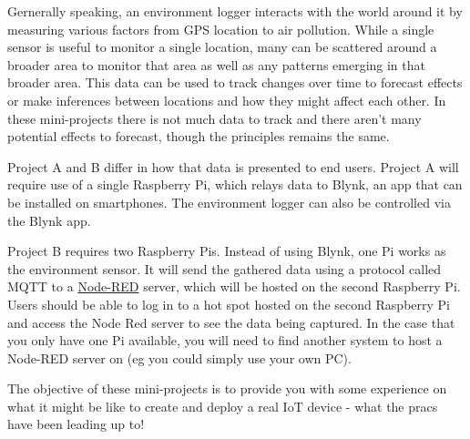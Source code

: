 Gernerally speaking, an environment logger interacts with the world around it by measuring various factors from GPS location to air pollution. While a single sensor is useful to monitor a single location, many can be scattered around a broader area to monitor that area as well as any patterns emerging in that broader area. This data can be used to track changes over time to forecast effects or make inferences between locations and how they might affect each other. In these mini-projects there is not much data to track and there aren't many potential effects to forecast, though the principles remains the same.

Project A and B differ in how that data is presented to end users. Project A will require use of a single Raspberry Pi, which relays data to Blynk, an app that can be installed on smartphones. The environment logger can also be controlled via the Blynk app.

Project B requires two Raspberry Pis. Instead of using Blynk, one Pi works as the environment sensor. It will send the gathered data using a protocol called MQTT to a \href{https://nodered.org/}{Node-RED} server, which will be hosted on the second Raspberry Pi. Users should be able to log in to a hot spot hosted on the second Raspberry Pi and access the Node Red server to see the data being captured. In the case that you only have one Pi available, you will need to find another system to host a Node-RED server on (eg you could simply use your own PC).

The objective of these mini-projects is to provide you with some experience on what it might be like to create and deploy a real IoT device - what the pracs have been leading up to!








